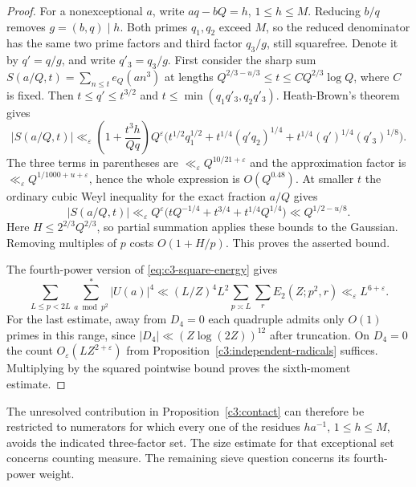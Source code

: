 \documentclass[11pt,letterpaper]{article}
\theoremstyle{definition}
\begin{document}
\begin{proof}
For a nonexceptional $a$, write $aq-bQ=h$, $1\le h\le M$.
Reducing $b/q$ removes $g=(b,q)\mid h$. Both primes $q_1,q_2$
exceed $M$, so the reduced denominator has the same two prime
factors and third factor $q_3/g$, still squarefree. Denote it by
$q'=q/g$, and write $q'_3=q_3/g$. First consider the sharp sum
$S(a/Q,t)=\sum_{n\le t}e_Q(an^3)$ at lengths
$Q^{2/3-u/3}\le t\le C Q^{2/3}\log Q$, where $C$ is fixed.
Then $t\le q'\le t^{3/2}$ and
$t\le\min(q_1q'_3,q_2q'_3)$. Heath-Brown's theorem gives
\[
 |S(a/Q,t)|\ll_\varepsilon
 \left(1+\frac{t^3h}{Qq}\right) Q^\varepsilon
  \big(t^{1/2}q_1^{1/2}+t^{1/4}(q'q_2)^{1/4}
                   +t^{1/4}(q')^{1/4}(q'_3)^{1/8}\big).
\]
The three terms in parentheses are
$\ll_\varepsilon Q^{10/21+\varepsilon}$ and the approximation
factor is $\ll_\varepsilon Q^{1/1000+u+\varepsilon}$, hence the
whole expression is $O(Q^{0.48})$.
At smaller $t$ the ordinary cubic Weyl inequality for the exact
fraction $a/Q$ gives
\[
 |S(a/Q,t)|\ll_\varepsilon Q^\varepsilon
       \big(tQ^{-1/4}+t^{3/4}+t^{1/4}Q^{1/4}\big)
       \ll Q^{1/2-u/8}.
\]
Here $H\le 2^{2/3}Q^{2/3}$, so partial summation applies these
bounds to the Gaussian. Removing multiples of $p$ costs
$O(1+H/p)$. This proves the asserted bound.

The fourth-power version of \eqref{eq:c3-square-energy} gives
\[
 \sum_{L\le p<2L}\sum_{a\bmod p^2}^*|U(a)|^4
 \ll (L/Z)^4 L^2 \sum_{p\asymp L}\sum_r E_2(Z;p^2,r)
 \ll_\varepsilon L^{6+\varepsilon}.
\]
For the last estimate, away from $D_4=0$ each quadruple admits
only $O(1)$ primes in this range, since $|D_4|\ll
(Z\log(2Z))^{12}$ after truncation. On $D_4=0$ the count
$O_\varepsilon(LZ^{2+\varepsilon})$ from
Proposition~\ref{c3:independent-radicals} suffices. Multiplying by
the squared pointwise bound proves the sixth-moment estimate.
\end{proof}

The unresolved contribution in Proposition~\ref{c3:contact} can
therefore be restricted to numerators for which every one of the
residues $h a^{-1}$, $1\le h\le M$, avoids the indicated three-factor
set. The size estimate for that exceptional set concerns counting
measure. The remaining sieve question concerns its fourth-power
weight.
\end{document}
